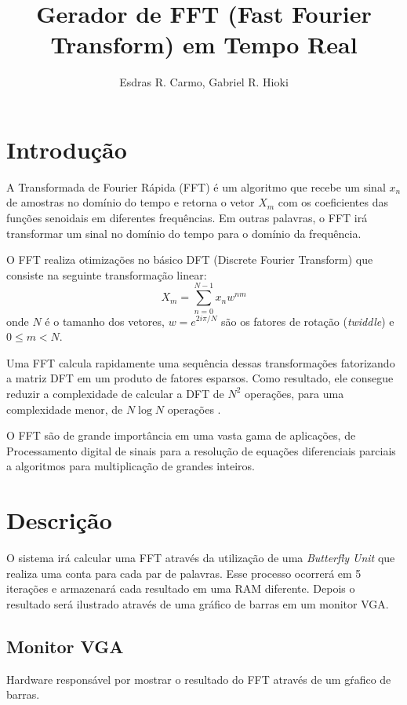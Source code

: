 \documentclass{article}
\newcommand{\tit}[1]{\textit{#1}}
\begin{document}
\title{Gerador de FFT (Fast Fourier Transform) em Tempo Real}
\author{Esdras R. Carmo, Gabriel R. Hioki}

\maketitle
\newpage
\tableofcontents
\newpage

\section{Introdução}


   A Transformada de Fourier Rápida (FFT) é um algoritmo que recebe um sinal
$x_n$ de amostras no domínio do tempo e retorna o vetor $X_m$ com os coeficientes
das funções senoidais em diferentes frequências. Em outras palavras, o FFT irá 
transformar um sinal no domínio do tempo para o domínio da frequência.

O FFT realiza otimizações no básico DFT (Discrete Fourier Transform) que consiste na seguinte
transformação linear:
$$
    X_m = \sum_{n=0}^{N-1}x_n w^{nm}
$$
onde $N$ é o tamanho dos vetores, $w = e^{2i\pi/N}$ são os fatores de rotação (\tit{twiddle}) e
$0 \leq m < N$. 

Uma FFT calcula rapidamente uma sequência dessas transformações fatorizando a matriz DFT em um produto de fatores esparsos. Como resultado, ele consegue reduzir a complexidade de calcular a DFT de  $N^2$ operações, para uma complexidade menor, de $N \log N$ operações \cite{fft-hardware}.

O FFT são de grande importância em uma vasta gama de aplicações, de Processamento digital de sinais para a resolução de equações diferenciais parciais a algoritmos para multiplicação de grandes inteiros.

\section{Descrição}
	O sistema irá calcular uma FFT através da utilização de uma \tit{Butterfly Unit} que realiza uma conta para cada par de palavras. Esse processo ocorrerá em 5 iterações e armazenará cada resultado em uma RAM diferente. Depois o resultado será ilustrado através de uma gráfico de barras em um monitor VGA.
\subsection{Monitor VGA}
    Hardware responsável por mostrar o resultado do FFT através de um gŕafico de barras.
\end{document}
